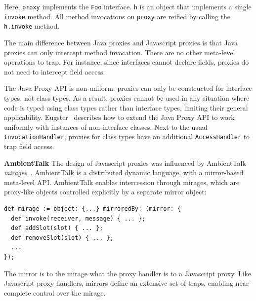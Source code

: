 \documentclass{sig-alternate}
\begin{document}
Here, \texttt{proxy} implements the \texttt{Foo} interface. \texttt{h} is an object that implements a single \texttt{invoke} method. All method invocations on \texttt{proxy} are reified by calling the \texttt{h.invoke} method.%

The main difference between Java proxies and Javascript proxies is that Java proxies can only intercept method invocation. There are no other meta-level operations to trap. For instance, since interfaces cannot declare fields, proxies do not need to intercept field access.

The Java Proxy API is non-uniform: proxies can only be constructed for interface types, not class types. As a result, proxies cannot be used in any situation where code is typed using class types rather than interface types, limiting their general applicability. Eugster~\cite{eugster06uniform} describes how to extend the Java Proxy API to work uniformly with instances of non-interface classes. Next to the usual \texttt{InvocationHandler}, proxies for class types have an additional \texttt{AccessHandler} to trap field access.


\textbf{AmbientTalk} The design of Javascript proxies was influenced by AmbientTalk \emph{mirages}~\cite{mostinckx07behavioral}. AmbientTalk is a distributed dynamic language, with a mirror-based meta-level API. AmbientTalk enables intercession through mirages, which are proxy-like objects controlled explicitly by a separate mirror object:

\begin{lstlisting}[]
def mirage := object: {...} mirroredBy: (mirror: {
  def invoke(receiver, message) { ... };
  def addSlot(slot) { ... };
  def removeSlot(slot) { ... };
  ...
});
\end{lstlisting}

The mirror is to the mirage what the proxy handler is to a Javascript proxy. Like Javascript proxy handlers, mirrors define an extensive set of traps, enabling near-complete control over the mirage.
\end{document}
